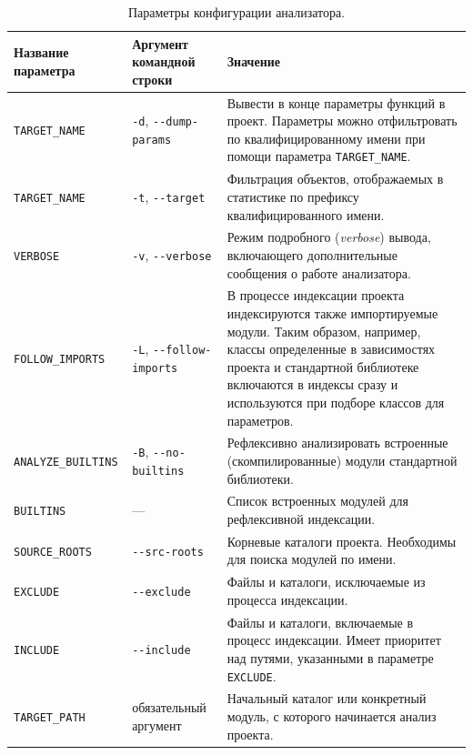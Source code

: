 \begin{table}[H]
  \small
  \caption{Параметры конфигурации анализатора.}
  \label{tab:config-ref}
  \begin{tabularx}{\textwidth}{ |X|X|X| }
    \hline
    Название параметра & Аргумент командной строки & Значение \\
    \hline

    \texttt{TARGET\_NAME} & \texttt{-d}, \texttt{-{}-dump-params} & Вывести
    в конце параметры функций в проект. Параметры можно отфильтровать по
    квалифицированному имени при помощи параметра \texttt{TARGET\_NAME}.
    \\ \hline

    \texttt{TARGET\_NAME} & \texttt{-t}, \texttt{-{}-target} &  Фильтрация
    объектов, отображаемых в статистике по префиксу квалифицированного имени.
    \\ \hline

    \texttt{VERBOSE} & \texttt{-v}, \texttt{-{}-verbose} & Режим подробного
    (\emph{verbose}) вывода, включающего дополнительные сообщения о работе
    анализатора.
    \\ \hline

    \texttt{FOLLOW\_IMPORTS} & \texttt{-L}, \texttt{-{}-follow-imports} & 
    В процессе индексации проекта индексируются также импортируемые модули.
    Таким образом, например, классы определенные в зависимостях проекта и
    стандартной библиотеке включаются в индексы сразу и используются при подборе
    классов для параметров.
    \\ \hline

    \texttt{ANALYZE\_BUILTINS} & \texttt{-B}, \texttt{-{}-no-builtins} &
    Рефлексивно анализировать встроенные (скомпилированные) модули стандартной
    библиотеки.
    \\ \hline

    \texttt{BUILTINS} & --- & Список встроенных модулей для рефлексивной
    индексации.
    \\ \hline
    
    \texttt{SOURCE\_ROOTS} & \texttt{-{}-src-roots} & Корневые каталоги проекта.
    Необходимы для поиска модулей по имени.  
    \\ \hline

    \texttt{EXCLUDE} & \texttt{-{}-exclude} & Файлы и каталоги, исключаемые из
    процесса индексации.
    \\ \hline

    \texttt{INCLUDE} & \texttt{-{}-include} & Файлы и каталоги, включаемые в
    процесс индексации. Имеет приоритет над путями, указанными в параметре
    \texttt{EXCLUDE}.
    \\ \hline

    \texttt{TARGET\_PATH} & обязательный аргумент & Начальный каталог или
    конкретный модуль, с которого начинается анализ проекта.
    \\ \hline

  \end{tabularx}
\end{table}

